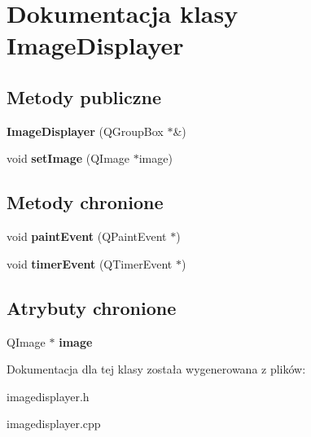\hypertarget{class_image_displayer}{
\section{Dokumentacja klasy ImageDisplayer}
\label{class_image_displayer}
}
\subsection*{Metody publiczne}
\begin{DoxyCompactItemize}
\item 
\hypertarget{class_image_displayer_ade6ee3928461e16ae867a744b647121e}{
{\bfseries ImageDisplayer} (QGroupBox $\ast$\&)}
\label{class_image_displayer_ade6ee3928461e16ae867a744b647121e}

\item 
\hypertarget{class_image_displayer_aa801ce426124fdd201a56e44e8b24610}{
void {\bfseries setImage} (QImage $\ast$image)}
\label{class_image_displayer_aa801ce426124fdd201a56e44e8b24610}

\end{DoxyCompactItemize}
\subsection*{Metody chronione}
\begin{DoxyCompactItemize}
\item 
\hypertarget{class_image_displayer_ab892b4b10728fa072aedfa5a315cd319}{
void {\bfseries paintEvent} (QPaintEvent $\ast$)}
\label{class_image_displayer_ab892b4b10728fa072aedfa5a315cd319}

\item 
\hypertarget{class_image_displayer_ad6a7e7b0d923cc2b948bbca7e54b5af7}{
void {\bfseries timerEvent} (QTimerEvent $\ast$)}
\label{class_image_displayer_ad6a7e7b0d923cc2b948bbca7e54b5af7}

\end{DoxyCompactItemize}
\subsection*{Atrybuty chronione}
\begin{DoxyCompactItemize}
\item 
\hypertarget{class_image_displayer_a425fc06c5474754684575cd80e378bd1}{
QImage $\ast$ {\bfseries image}}
\label{class_image_displayer_a425fc06c5474754684575cd80e378bd1}

\end{DoxyCompactItemize}


Dokumentacja dla tej klasy została wygenerowana z plików:\begin{DoxyCompactItemize}
\item 
imagedisplayer.h\item 
imagedisplayer.cpp\end{DoxyCompactItemize}
